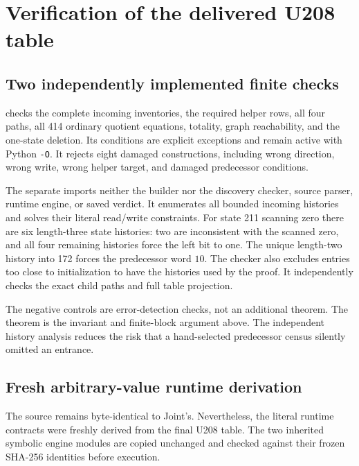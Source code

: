 \documentclass[11pt,letterpaper]{article}
\newcommand{\code}[1]{\texttt{#1}}
\begin{document}
\section{Verification of the delivered U208 table}
\subsection{Two independently implemented finite checks}

 checks the complete incoming inventories, the
required helper rows, all four paths, all 414 ordinary quotient equations,
totality, graph reachability, and the one-state deletion. Its conditions are
explicit exceptions and remain active with Python \code{-O}. It rejects
eight damaged constructions, including wrong direction, wrong write,
wrong helper target, and damaged predecessor conditions.

The separate  imports neither the
builder nor the discovery checker, source parser, runtime engine, or saved
verdict. It enumerates all bounded incoming histories and solves their
literal read/write constraints. For state 211 scanning zero there are six
length-three state histories: two are inconsistent with the scanned zero,
and all four remaining histories force the left bit to one. The unique
length-two history into 172 forces the predecessor word $10$. The checker
also excludes entries too close to initialization to have the histories
used by the proof. It independently checks the exact child paths and full
table projection.

The negative controls are error-detection checks, not an additional theorem.
The theorem is the invariant and finite-block argument above. The independent
history analysis reduces the risk that a hand-selected predecessor census
silently omitted an entrance.

\subsection{Fresh arbitrary-value runtime derivation}

The source remains byte-identical to Joint's. Nevertheless, the literal
runtime contracts were freshly derived from the final U208 table. The two
inherited symbolic engine modules are copied unchanged and checked against
their frozen SHA-256 identities before execution.
\end{document}
